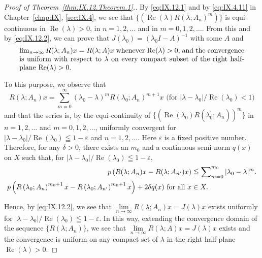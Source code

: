 \begin{proof}[Proof of Theorem~\ref{thm:IX.12.Theorem.1}.]
By \eqref{eq:IX.12.1} and by \eqref{eq:IX.4.11} in Chapter~\ref{chap:IX}, \ref{sec:IX.4}, we see that $\{(\operatorname{Re}(\lambda) R(\lambda; A_n)^m)\}$ is equi-continuous in $\operatorname{Re}(\lambda) > 0$, in $n = 1, 2, \ldots$ and in $m = 0, 1, 2, \ldots$. From this and by \eqref{eq:IX.12.2}, we can prove that $J(\lambda_0) = (\lambda_0 I - A)^{-1}$ with some $A$ and
\begin{equation}
\label{eq:IX.12.7}
\begin{minipage}{0.92\linewidth}
\everymath{}\let\limits\nolimits
$\lim\limits _{n \rightarrow \infty} R (\lambda; A _{n}) x = R (\lambda; A) x$ whenever $\operatorname{Re} (\lambda) > 0,$ and the convergence is uniform with respect to $\lambda$ on every compact subset of the right half-plane $\operatorname{Re} (\lambda) > 0.$
\end{minipage}
\end{equation}

To this purpose, we observe that 
\[
R (\lambda ; A _{n}) x = \sum\limits_{m=0} ^{\infty} (\lambda_{0} - \lambda) ^{m} R (\lambda_{0}; A _{n}) ^{m+1} x \text{ (for } | \lambda - \lambda_{0} | / \operatorname{Re} (\lambda_{0}) < 1)
\]
and that the series is, by the equi-continuity of $\{(\operatorname{Re}(\lambda_0)R(\lambda_0^{\prime};A_n))^m\}$ in $n = 1,2,\ldots$ and $m = 0,1,2,\ldots$, uniformly convergent for $|\lambda -\lambda_0| / \operatorname{Re}(\lambda_0)\leqq 1 - \varepsilon$ and $n = 1,2,\ldots$. Here $\varepsilon$ is a fixed positive number. Therefore, for any $\delta >0$, there exists an $m_0$ and a continuous semi-norm $q(x)$ on $X$ such that, for $|\lambda -\lambda_0| / \operatorname{Re}(\lambda_0)\leqq 1 - \varepsilon$, 
\begin{align}
p \left(R (\lambda ; A _{n}) x - R (\lambda ; A _ {n ^{\prime}}) x\right)& \leqq \sum\limits_{m=0} ^ {m _{0}} | \lambda_{0} - \lambda | ^{m}. \notag \\
p \left(R \left(\lambda_{0}; A _{n}\right) ^ {m _{0} + 1} x - R \left(\lambda_{0}; A _ {n ^{\prime}}\right) ^ {m _{0} + 1} x\right) + 2 \delta q (x) \text{ for all } x& \in X. \notag
\end{align}

Hence, by \eqref{eq:IX.12.2}, we see that $\lim\limits_{n\to \infty}R(\lambda ;A_n)x = J(\lambda)x$ exists uniformly for $|\lambda -\lambda_0| / \operatorname{Re}(\lambda_0)\leqq 1 - \varepsilon$. In this way, extending the convergence domain of the sequence $\{R(\lambda ;A_n)\}$, we see that 
$\lim\limits_{n\to \infty}R(\lambda ;A)x = J(\lambda)x$ exists and the convergence is uniform 
on any compact set of $\lambda$ in the right half-plane $\operatorname{Re}(\lambda) > 0$. 


\end{proof}
